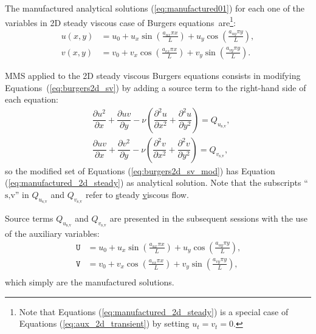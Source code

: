 \documentclass[10pt]{article}
\newcommand{\diff}[2] {\dfrac{\partial #1}{\partial #2}}
\newcommand{\U}{\,\mathtt{U}}
\newcommand{\V}{\,\mathtt{V}}
\begin{document}
The manufactured analytical solutions (\ref{eq:manufactured01}) for each one of the variables in 2D steady viscous case of Burgers equations~are\footnote{Note that Equations (\ref{eq:manufactured_2d_steady}) is a special case of Equations (\ref{eq:aux_2d_transient}) by setting $u_t=v_t=0$.}:
\begin{equation}
\begin{split}
\label{eq:manufactured_2d_steady}
u\left(x,y\right) &= u_{0}+u_{x} \sin\left(\frac{a_{u x} \pi x}{L}\right)+u_{y} \cos\left(\frac{a_{u y} \pi y}{L}\right) ,\\
v\left(x,y\right) &= v_{0}+v_{x} \cos\left(\frac{a_{v x} \pi x}{L}\right)+v_{y} \sin\left(\frac{a_{v y} \pi y}{L}\right).
\end{split}
\end{equation}


MMS applied to the 2D steady viscous Burgers equations consists in modifying Equations~(\ref{eq:burgers2d_sv}) by adding a source term to the right-hand side of each equation:
\begin{equation}
 \label{eq:burgers2d_sv_mod}
\begin{split}
 & \diff{ u^2 }{x}+\diff{uv}{y}-\nu \left( \diff{^2u}{ x^2}+ \diff{^2u }{y^2}\right)= Q_{u_\text{s,v}},\\
& \diff{ u v}{x} + \diff{  v^2 }{y}-\nu \left( \diff{^2v}{ x^2}+ \diff{^2v }{y^2}\right)=Q_{v_\text{s,v}},
\end{split}
\end{equation}
so the modified set of Equations (\ref{eq:burgers2d_sv_mod}) has Equation (\ref{eq:manufactured_2d_steady}) as analytical solution. Note that the subscripts ``$\text{s,v}$'' in $Q_{u_\text{s,v}}$ and $Q_{v_\text{s,v}}$  refer to \underline{s}teady \underline{v}iscous flow.


Source terms $Q_{u_\text{s,v}}$ and $Q_{v_\text{s,v}}$ are presented in the subsequent sessions with the use of the auxiliary variables:
\begin{equation}
 \begin{split}
\label{eq:aux_2d_steady}
\U &= u_{0}+u_{x} \sin\left(\frac{a_{u x} \pi x}{L}\right)+u_{y} \cos\left(\frac{a_{u y} \pi y}{L}\right) ,\\
\V &= v_{0}+v_{x} \cos\left(\frac{a_{v x} \pi x}{L}\right)+v_{y} \sin\left(\frac{a_{v y} \pi y}{L}\right),\\
\end{split}
\end{equation}
%
which simply are the manufactured solutions.
\end{document}
